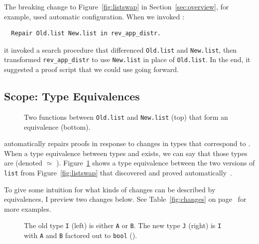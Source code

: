 The breaking change to Figure~\ref{fig:listswap} in Section~\ref{sec:overview}, for example, used automatic configuration.
When we invoked \toolnamec:

\begin{lstlisting}
  Repair Old.list New.list in rev_app_distr.
\end{lstlisting}
it invoked a search procedure that differenced \lstinline{Old.list} and \lstinline{New.list},
then transformed \lstinline{rev_app_distr} to use \lstinline{New.list} in place of \lstinline{Old.list}.
In the end, it suggested a proof script that we could use going forward.

\subsection{Scope: Type Equivalences}
\label{sec:pi-scope}

\begin{figure}
\caption{Two functions between \lstinline{Old.list} and \lstinline{New.list} (top) that form an equivalence (bottom).}
\label{fig:equivalence}
\end{figure}

\toolnamec automatically repairs proofs in response to changes in types that correspond to .
When a type equivalence between types \Aa and \B exists, we can say that those types are  (denoted \Aa $\simeq$ \B). %
Figure~\ref{fig:equivalence} shows a type equivalence between the two versions of \lstinline{list}
from Figure~\ref{fig:listswap} that \toolnamec discovered and proved automatically~\href{https://github.com/uwplse/pumpkin-pi/blob/v2.0.0/plugin/coq/Swap.v}{}.

To give some intuition for what kinds of changes can be described by equivalences, I preview two changes below.
See Table~\ref{fig:changes} on page~\pageref{fig:changes} for more examples.

\begin{figure}
\begin{minipage}{0.48\columnwidth}

\end{minipage}
\hfill
\begin{minipage}{0.48\columnwidth}

\end{minipage}
\caption{The old type \lstinline{I} (left) is either \lstinline{A} or \lstinline{B}. The new type \lstinline{J} (right) is \lstinline{I} with \lstinline{A} and \lstinline{B} factored out to \lstinline{bool} ().}
\label{fig:equivalence2}
\end{figure}

